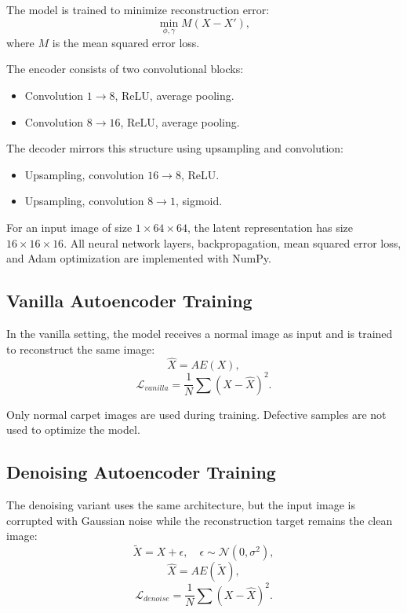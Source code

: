 \documentclass[conference]{IEEEtran}
\begin{document}
The model is trained to minimize reconstruction error:
\begin{equation}
    \min_{\phi,\gamma} M(X - X'),
\end{equation}
where $M$ is the mean squared error loss.

The encoder consists of two convolutional blocks:
\begin{itemize}
    \item Convolution $1 \rightarrow 8$, ReLU, average pooling.
    \item Convolution $8 \rightarrow 16$, ReLU, average pooling.
\end{itemize}

The decoder mirrors this structure using upsampling and convolution:
\begin{itemize}
    \item Upsampling, convolution $16 \rightarrow 8$, ReLU.
    \item Upsampling, convolution $8 \rightarrow 1$, sigmoid.
\end{itemize}

For an input image of size $1 \times 64 \times 64$, the latent representation has size $16 \times 16 \times 16$. All neural network layers, backpropagation, mean squared error loss, and Adam optimization are implemented with NumPy.

\subsection{Vanilla Autoencoder Training}
In the vanilla setting, the model receives a normal image as input and is trained to reconstruct the same image:
\begin{equation}
    \hat{X} = AE(X),
\end{equation}
\begin{equation}
    \mathcal{L}_{vanilla} = \frac{1}{N}\sum (X - \hat{X})^2.
\end{equation}

Only normal carpet images are used during training. Defective samples are not used to optimize the model.

\subsection{Denoising Autoencoder Training}
The denoising variant uses the same architecture, but the input image is corrupted with Gaussian noise while the reconstruction target remains the clean image:
\begin{equation}
    \tilde{X} = X + \epsilon,\quad \epsilon \sim \mathcal{N}(0,\sigma^2),
\end{equation}
\begin{equation}
    \hat{X} = AE(\tilde{X}),
\end{equation}
\begin{equation}
    \mathcal{L}_{denoise} = \frac{1}{N}\sum (X - \hat{X})^2.
\end{equation}
\end{document}
